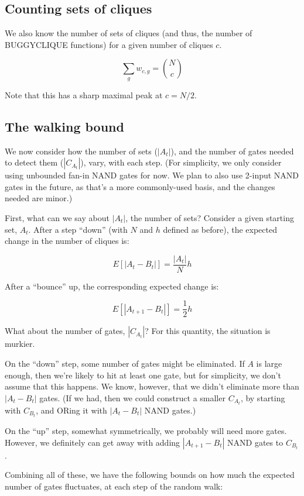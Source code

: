 \documentclass[12pt]{article}
\theoremstyle{definition}
\begin{document}
\subsection{Counting sets of cliques}

We also know the number of sets of cliques (and thus, the number
of BUGGYCLIQUE functions) for a given number of cliques $c$.

\[
\sum_g w_{c,g} = {N \choose c}
\]

Note that this has a sharp maximal peak at $c = N/2$.

\subsection{The walking bound}

We now consider how the number of sets ($|A_t|$), and
the number of gates needed to detect them ($|C_{A_t}|$),
vary, with each step. (For simplicity, we only consider
using unbounded fan-in NAND gates for now. We plan to
also use 2-input NAND gates in the future, as that's a
more commonly-used basis, and the changes needed are minor.)

First, what can we say about $|A_t|$, the number of sets?
Consider a given starting set, $A_t$.
After a step ``down'' (with $N$ and $h$ defined as before),
the expected change in the number of cliques is:

\[
E[|A_t - B_t|] = \frac{|A_t|}{N}h
\]

After a ``bounce'' up, the corresponding expected change is:

\[
E[|A_{t+1} - B_t|] = \frac{1}{2}h
\]

What about the number of gates, $|C_{A_t}|$? For this quantity,
the situation is murkier.

On the ``down'' step, some number of gates might be eliminated.
If $A$ is large enough, then we're likely to hit at least one gate,
but for simplicity, we don't assume that this happens.
We know, however, that we didn't eliminate more than $|A_t - B_t|$
gates. (If we had, then we could construct a smaller $C_{A_t}$,
by starting with $C_{B_t}$, and ORing it with $|A_t - B_t|$
NAND gates.)

On the ``up'' step, somewhat symmetrically, we probably will
need more gates. However, we definitely can get away with
adding $|A_{t+1} - B_t|$ NAND gates to $C_{B_t}$.

Combining all of these, we have the following bounds on how much the
expected number of gates fluctuates, at each step of the random walk:
\end{document}

